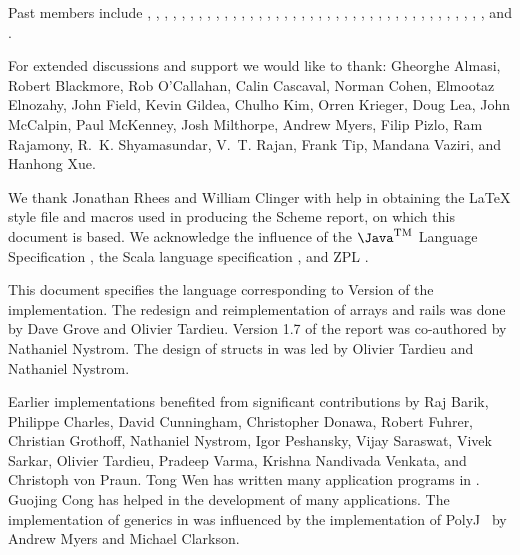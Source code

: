 Past members include
, 
, 
, 
, 
, 
, 
, 
, 
, 
, 
, 
,
,
,
, 
, 
, 
, 
, 
, 
, 
, 
,
, 
,
, 
,
,  
, 
, 
, 
, 
,
,
, 
,
, 
, 
, 
, and
.


For extended discussions and support we would like to thank: 
Gheorghe Almasi,
Robert Blackmore,
Rob O'Callahan, 
Calin Cascaval, 
Norman Cohen, 
Elmootaz Elnozahy, 
John Field,
Kevin Gildea,
Chulho Kim,
Orren Krieger, 
Doug Lea, 
John McCalpin, 
Paul McKenney, 
Josh Milthorpe,
Andrew Myers,
Filip Pizlo, 
Ram Rajamony,
R.~K. Shyamasundar, 
V.~T. Rajan, 
Frank Tip,
Mandana Vaziri,
and
Hanhong Xue.


We thank Jonathan Rhees and William Clinger with help in obtaining the
\LaTeX{} style file and macros used in producing the Scheme report,
on which this document is based. We acknowledge the influence of
the $\mbox{\Java}^{\mbox{\textsc{tm}}}$ Language
Specification \cite{jls2}, the Scala language specification
\cite{scala-spec}, and ZPL \cite{zpl}.

This document specifies the language corresponding to Version
\integerversion{} of the implementation. The redesign and reimplementation of arrays and rails was  done by Dave Grove and Olivier Tardieu.
 Version 1.7 of the report was co-authored by Nathaniel Nystrom. The design of structs in \Xten{} was led by Olivier Tardieu and Nathaniel Nystrom.

Earlier implementations benefited from significant contributions by
Raj Barik, 
Philippe Charles, 
David Cunningham,
Christopher Donawa, 
Robert Fuhrer,
Christian Grothoff,
Nathaniel Nystrom,  
Igor Peshansky,  
Vijay Saraswat,
Vivek Sarkar, 
Olivier Tardieu,  
Pradeep Varma, 
Krishna Nandivada Venkata, and
Christoph von Praun.
Tong Wen has written many application programs
in \Xten{}. Guojing Cong has helped in the
development of many applications.
The implementation of generics in \Xten{} was influenced by the
implementation of PolyJ~\cite{polyj} by Andrew Myers and Michael Clarkson.
